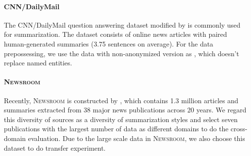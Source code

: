 \documentclass[11pt,a4paper]{article}
\begin{document}
\paragraph{CNN/DailyMail}
The CNN/DailyMail question answering dataset \cite{hermann2015teaching} modified by \cite{nallapati2016abstractive} is commonly used for summarization. The dataset consists of online news articles with paired human-generated summaries (3.75 sentences on average).
For the data prepossessing, we use the data with non-anonymized version as \cite{see2017get}, which doesn't replace named entities.

\paragraph{\textsc{Newsroom}}
Recently, \textsc{Newsroom} is constructed by \cite{grusky2018newsroom}, which contains 1.3 million articles and summaries extracted from 38 major news publications across 20 years. We regard this diversity of sources as a diversity of summarization styles and select seven publications with the largest number of data as different domains to do the cross-domain evaluation. Due to the large scale data in \textsc{Newsroom}, we also choose this dataset to do transfer experiment.
\end{document}
